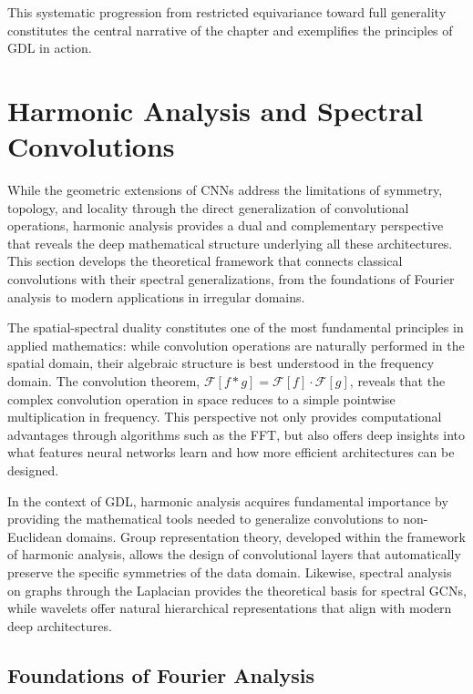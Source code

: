 This systematic progression from restricted equivariance toward full generality constitutes the central narrative of the chapter and exemplifies the principles of \gls{GDL} in action.

\section{Harmonic Analysis and Spectral Convolutions}\label{sec:analisis_armonico}

While the geometric extensions of \glspl{CNN} address the limitations of symmetry, topology, and locality through the direct generalization of convolutional operations, harmonic analysis provides a dual and complementary perspective that reveals the deep mathematical structure underlying all these architectures. This section develops the theoretical framework that connects classical convolutions with their spectral generalizations, from the foundations of Fourier analysis to modern applications in irregular domains.

The spatial-spectral duality constitutes one of the most fundamental principles in applied mathematics: while convolution operations are naturally performed in the spatial domain, their algebraic structure is best understood in the frequency domain. The convolution theorem, $\mathcal{F}[f * g] = \mathcal{F}[f] \cdot \mathcal{F}[g]$, reveals that the complex convolution operation in space reduces to a simple pointwise multiplication in frequency. This perspective not only provides computational advantages through algorithms such as the \gls{FFT}, but also offers deep insights into what features neural networks learn and how more efficient architectures can be designed.

In the context of \gls{GDL}, harmonic analysis acquires fundamental importance by providing the mathematical tools needed to generalize convolutions to non-Euclidean domains. Group representation theory, developed within the framework of harmonic analysis, allows the design of convolutional layers that automatically preserve the specific symmetries of the data domain. Likewise, spectral analysis on graphs through the Laplacian provides the theoretical basis for spectral \glspl{GCN}, while wavelets offer natural hierarchical representations that align with modern deep architectures.

\subsection{Foundations of Fourier Analysis}\label{subsec:fundamentos_fourier}

